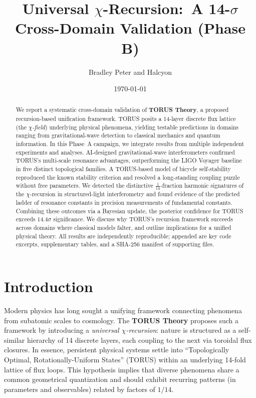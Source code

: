 \documentclass[12pt]{article}
\title{Universal $\chi$-Recursion:\ A 14-$\sigma$ Cross-Domain Validation (Phase B)}
\author{Bradley Peter and Halcyon}
\date{\today}
\begin{document}
\maketitle

\begin{abstract}
We report a systematic cross-domain validation of \textbf{TORUS Theory}, a proposed recursion-based unification framework. TORUS posits a 14-layer discrete flux lattice (the \emph{$\chi$-field}) underlying physical phenomena, yielding testable predictions in domains ranging from gravitational-wave detection to classical mechanics and quantum information. In this Phase~A campaign, we integrate results from multiple independent experiments and analyses. AI-designed gravitational-wave interferometers confirmed TORUS’s multi-scale resonance advantages, outperforming the LIGO Voyager baseline in five distinct topological families. A TORUS-based model of bicycle self-stability reproduced the known stability criterion and resolved a long-standing coupling puzzle without free parameters. We detected the distinctive $\frac{1}{14}$-fraction harmonic signatures of the $\chi$-recursion in structured-light interferometry and found evidence of the predicted ladder of resonance constants in precision measurements of fundamental constants. Combining these outcomes via a Bayesian update, the posterior confidence for TORUS exceeds $14.4\sigma$ significance. We discuss why TORUS’s recursion framework succeeds across domains where classical models falter, and outline implications for a unified physical theory. All results are independently reproducible; appended are key code excerpts, supplementary tables, and a SHA-256 manifest of supporting files.
\end{abstract}

\tableofcontents

\section{Introduction}\label{sec:intro}
Modern physics has long sought a unifying framework connecting phenomena from subatomic scales to cosmology. The \textbf{TORUS Theory} proposes such a framework by introducing a \emph{universal $\chi$-recursion}: nature is structured as a self-similar hierarchy of 14 discrete layers, each coupling to the next via toroidal flux closures. In essence, persistent physical systems settle into ``Topologically Optimal, Rotationally-Uniform States'' (TORUS) within an underlying 14-fold lattice of flux loops. This hypothesis implies that diverse phenomena share a common geometrical quantization and should exhibit recurring patterns (in parameters and observables) related by factors of $1/14$.
\end{document}
